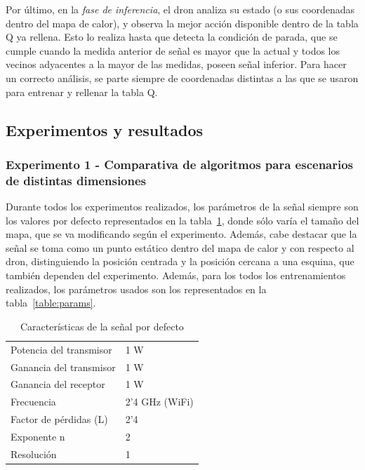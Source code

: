 Por último, en la \emph{fase de inferencia}, el dron analiza su estado (o sus coordenadas dentro del mapa de calor), y observa la mejor acción disponible dentro de la tabla Q ya rellena. Esto lo realiza hasta que detecta la condición de parada, que se cumple cuando la medida anterior de señal es mayor que la actual y todos los vecinos adyacentes a la mayor de las medidas, poseen señal inferior. Para hacer un correcto análisis, se parte siempre de coordenadas distintas a las que se usaron para entrenar y rellenar la tabla Q.

\subsection{Experimentos y resultados}
\label{subsec:experimentos_sf}

\subsubsection{Experimento 1 - Comparativa de algoritmos para escenarios de distintas dimensiones}
\label{subsubsec:experimentos_1}

Durante todos los experimentos realizados, los parámetros de la señal siempre son los valores por defecto representados en la tabla~\ref{table:compare_graph}, donde sólo varía el tamaño del mapa, que se va modificando según el experimento. Además, cabe destacar que la señal se toma como un punto estático dentro del mapa de calor y con respecto al dron, distinguiendo la posición centrada y la posición cercana a una esquina, que también dependen del experimento. Además, para los todos los entrenamientos realizados, los parámetros usados son los representados en la tabla~\ref{table:params}.\\

\begin{table} [t]
    \centering
    \begin{tabular}{ll}
    Potencia del transmisor & 1 W            \\
    Ganancia del transmisor & 1 W            \\
    Ganancia del receptor   & 1 W            \\
    Frecuencia              & 2'4 GHz (WiFi) \\
    Factor de pérdidas (L)  & 2'4            \\
    Exponente n             & 2              \\
    Resolución              & 1              \\
    \end{tabular}
    \caption[Características de la señal por defecto]{Características de la señal por defecto}
    \label{table:compare_graph}
\end{table}

